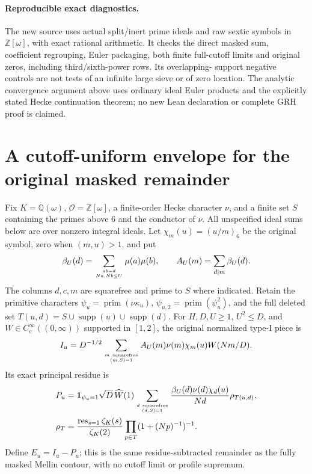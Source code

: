 \documentclass[11pt,oneside,openany]{book}
\theoremstyle{definition}\newtheorem{definition}[theorem]{Definition}
\theoremstyle{remark}\newtheorem{remark}[theorem]{Remark}
\begin{document}
\paragraph{Reproducible exact diagnostics.}
The new source 
uses actual split/inert prime ideals and raw sextic symbols in
$\mathbb Z[\omega]$, with exact rational arithmetic. It checks the direct
masked sum, coefficient regrouping, Euler packaging, both finite full-cutoff
limits and original zeros, including third/sixth-power rows. Its overlapping-
support negative controls are not tests of an infinite large sieve or of
zero location. The analytic convergence argument above uses ordinary ideal
Euler products and the explicitly stated Hecke continuation theorem; no
new Lean declaration or complete GRH proof is claimed.

\section{A cutoff-uniform envelope for the original masked remainder}
\label{wc:core}
Fix $K=\mathbb Q(\omega)$, $\mathcal O=\mathbb Z[\omega]$, a finite-order
Hecke character $\nu$, and a finite set $S$ containing the primes above $6$
and the conductor of $\nu$. All unspecified ideal sums below are over
nonzero integral ideals. Let $\chi_m(u)=(u/m)_6$ be the original symbol,
zero when $(m,u)>1$, and put
\[
 \beta_U(d)=\sum_{ab=d\atop Na,Nb\le U}\mu(a)\mu(b),\qquad
 A_U(m)=\sum_{d\mid m}\beta_U(d).
\]
The columns $d,c,m$ are squarefree and prime to $S$ where indicated.
Retain the primitive characters $\psi_u=\operatorname{prim}(\nu\kappa_u)$,
$\psi_{u,2}=\operatorname{prim}(\psi_u^2)$, and the full deleted set
$T(u,d)=S\cup\operatorname{supp}(u)\cup\operatorname{supp}(d)$.
For $H,D,U\ge1$, $U^2\le D$, and $W\in C_c^\infty((0,\infty))$
supported in $[1,2]$, the original normalized type-I piece is
\begin{equation}\label{wc:polynomial}
 I_u=D^{-1/2}\sum_{m\ \mathrm{squarefree}\atop(m,S)=1}
     A_U(m)\nu(m)\chi_m(u)W(Nm/D).
\end{equation}
Its exact principal residue is
\begin{align}\label{wc:principal}
 P_u&=\mathbf1_{\psi_u=1}\sqrt D\,\widehat W(1)
 \sum_{d\ \mathrm{squarefree}\atop(d,S)=1}
 \frac{\beta_U(d)\nu(d)\chi_d(u)}{Nd}\rho_{T(u,d)},\notag\\
 \rho_T&=\frac{\operatorname*{res}_{s=1}\zeta_K(s)}{\zeta_K(2)}
               \prod_{p\in T}(1+(Np)^{-1})^{-1}.
\end{align}
Define $E_u=I_u-P_u$; this is the same residue-subtracted remainder as the
fully masked Mellin contour, with no cutoff limit or profile supremum.
\end{document}
